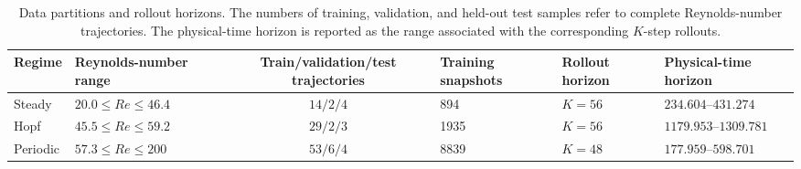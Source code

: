 
 
\begin{table}[t]
\centering
\caption{Data partitions and rollout horizons.
The numbers of training, validation, and held-out test samples refer to
complete Reynolds-number trajectories. The physical-time horizon is reported
as the range associated with the corresponding $K$-step rollouts.}
\label{tab:cylinder_data_contracts}

\scriptsize
\begin{adjustbox}{max width=\textwidth}
\begin{tabular}{@{}p{}p{}c
                p{}p{}p{}@{}}
\toprule
Regime
& Reynolds-number range
& Train/validation/test trajectories
& Training snapshots
& Rollout horizon
& Physical-time horizon \\
\midrule

Steady
& $20.0 \le Re \le 46.4$
& $14/2/4$
& 894
& $K=56$
& $234.604$--$431.274$ \\

Hopf
& $45.5 \le Re \le 59.2$
& $29/2/3$
& 1935
& $K=56$
& $1179.953$--$1309.781$ \\

Periodic
& $57.3 \le Re \le 200$
& $53/6/4$
& 8839
& $K=48$
& $177.959$--$598.701$ \\

\bottomrule
\end{tabular}
\end{adjustbox}
\end{table}



